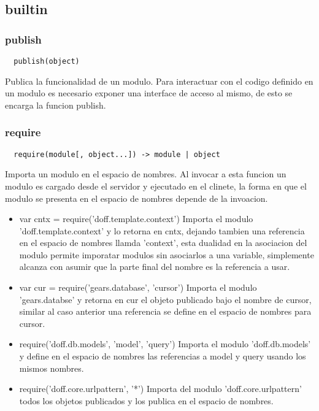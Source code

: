 \subsection{builtin}

\subsubsection*{publish}
\begin{verbatim}
  publish(object)
\end{verbatim}
Publica la funcionalidad de un modulo. 
Para interactuar con el codigo definido en un modulo es necesario
exponer una interface de acceso al mismo, de esto se encarga la funcion publish.

\subsubsection*{require}
\begin{verbatim}
  require(module[, object...]) -> module | object
\end{verbatim} 
Importa un modulo en el espacio de nombres.
Al invocar a esta funcion un modulo es cargado desde el servidor y ejecutado en
el clinete, la forma en que el modulo se presenta en el espacio de nombres
depende de la invoacion.
\begin{itemize}
 \item{var cntx = require('doff.template.context')}
  Importa el modulo 'doff.template.context' y lo retorna en cntx, dejando
tambien una referencia en el espacio de nombres llamda 'context', esta dualidad
en la asociacion del modulo permite imporatar modulos sin asociarlos a una
variable, simplemente alcanza con asumir que la parte final del nombre es la
referencia a usar.
 \item{var cur = require('gears.database', 'cursor')}
  Importa el modulo 'gears.databse' y retorna en cur el objeto publicado bajo el
nombre de cursor, similar al caso anterior una referencia se define en el
espacio de nombres para cursor.  
 \item{require('doff.db.models', 'model', 'query')}
  Importa el modulo 'doff.db.models' y define en el espacio de nombres las
referencias a model y query usando los mismos nombres.
 \item{require('doff.core.urlpattern', '*')}
  Importa del modulo 'doff.core.urlpattern' todos los objetos publicados y los
publica en el espacio de nombres.
\end{itemize}

